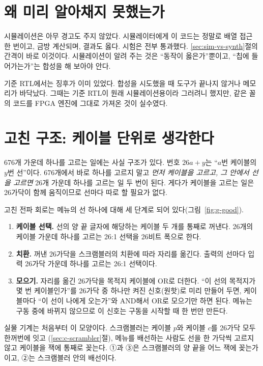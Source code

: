 \section{왜 미리 알아채지 못했는가}

시뮬레이션은 아무 경고도 주지 않았다. 시뮬레이터에게 이 코드는 정말로 배열 접근 한 번이고, 금방 계산되며,
결과도 옳다. 시험은 전부 통과했다. \ref{sec:sim-vs-synth}절의 간격이 바로 이것이다. 시뮬레이션이 알려 주는
것은 ``동작이 옳은가''뿐이고, ``칩에 들어가는가''는 합성을 해 보아야 안다.

기준 RTL에서는 징후가 이미 있었다. 합성을 시도했을 때 도구가 끝나지 않거나 메모리가 바닥났다. 그때는
기준 RTL이 원래 시뮬레이션용이라 그러려니 했지만, 같은 꼴의 코드를 FPGA 엔진에 그대로 가져온 것이 실수였다.

\section{고친 구조: 케이블 단위로 생각한다}

\Why 676개 가운데 하나를 고르는 일에는 사실 구조가 있다. 번호 $26a + y$는 ``$a$번 케이블의 $y$번 선''이다.
676개에서 바로 하나를 고르지 말고 \emph{먼저 케이블을 고르고, 그 안에서 선을 고르면} 26개 가운데 하나를
고르는 일 두 번이 된다. 게다가 케이블을 고르는 일은 26가닥이 함께 움직이므로 선마다 따로 할 필요가 없다.

고친 전파 회로는 메뉴의 선 하나에 대해 세 단계로 되어 있다(그림~\ref{fig:g-good}).

\begin{enumerate}
\item \textbf{케이블 선택.} 선의 양 끝 글자에 해당하는 케이블 두 개를 통째로 꺼낸다. 26개의 케이블 가운데
하나를 고르는 26:1 선택을 26비트 폭으로 한다.
\item \textbf{치환.} 꺼낸 26가닥을 스크램블러의 치환에 따라 자리를 옮긴다. 출력의 선마다 입력 26가닥
가운데 하나를 고르는 26:1 선택이다.
\item \textbf{모으기.} 자리를 옮긴 26가닥을 목적지 케이블에 OR로 더한다. ``이 선의 목적지가 몇 번
케이블인가''를 26가닥 중 하나만 켜진 신호(원핫)로 미리 만들어 두면, 케이블마다 ``이 선이 나에게 오는가''와
AND해서 OR로 모으기만 하면 된다. 메뉴는 구동 중에 바뀌지 않으므로 이 신호는 구동을 시작할 때 한 번만
만든다.
\end{enumerate}

실물 기계는 처음부터 이 모양이다. 스크램블러는 케이블 $p$와 케이블 $c$를 26가닥 모두 한꺼번에 잇고
(\ref{sec:c-scrambler}절), 메뉴를 배선하는 사람도 선을 한 가닥씩 고르지 않고 케이블을 잭에 통째로 꽂는다.
①과 ③은 스크램블러의 양 끝을 어느 잭에 꽂는가이고, ②는 스크램블러 안의 배선이다.

